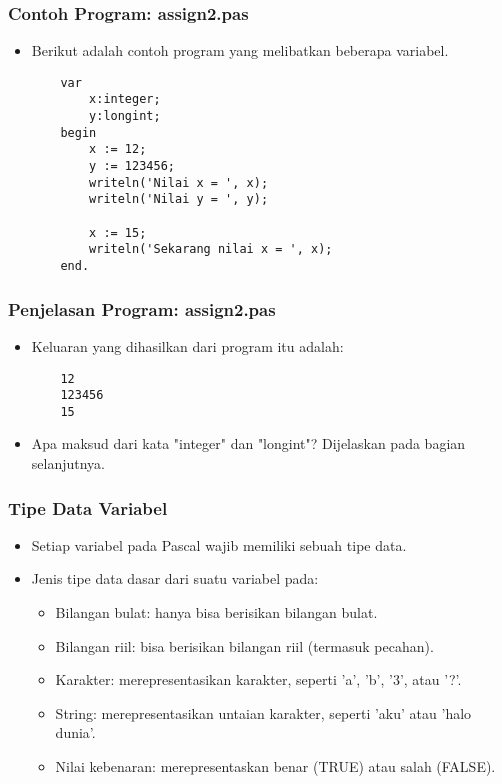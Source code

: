 \documentclass{beamer}
\begin{document}
\begin{frame}[fragile]
\frametitle{Contoh Program: assign2.pas}
\begin{itemize}
	\item Berikut adalah contoh program yang melibatkan beberapa variabel.
	\begin{lstlisting}
	var
	    x:integer;
	    y:longint;
	begin
	    x := 12;
	    y := 123456;
	    writeln('Nilai x = ', x);
	    writeln('Nilai y = ', y);
	    
	    x := 15;
	    writeln('Sekarang nilai x = ', x);
	end.
	\end{lstlisting}
\end{itemize}
\end{frame}

\begin{frame}[fragile]
\frametitle{Penjelasan Program: assign2.pas}
\begin{itemize}
	\item Keluaran yang dihasilkan dari program itu adalah:
	\begin{lstlisting}
	12
	123456
	15
	\end{lstlisting}
	\item Apa maksud dari kata "integer" dan "longint"? Dijelaskan pada bagian selanjutnya.
\end{itemize}
\end{frame}

\begin{frame}
\frametitle{Tipe Data Variabel}
\begin{itemize}
	\item Setiap variabel pada Pascal wajib memiliki sebuah \alert{tipe data}.
	\item Jenis tipe data dasar dari suatu variabel pada:
	\begin{itemize}
		\item Bilangan bulat: hanya bisa berisikan bilangan bulat.
		\item Bilangan riil: bisa berisikan bilangan riil (termasuk pecahan).
		\item Karakter: merepresentasikan karakter, seperti 'a', 'b', '3', atau '?'.
		\item String: merepresentasikan untaian karakter, seperti 'aku' atau 'halo dunia'.
		\item Nilai kebenaran: merepresentaskan benar (TRUE) atau salah (FALSE).
	\end{itemize}
\end{itemize}
\end{frame}
\end{document}
